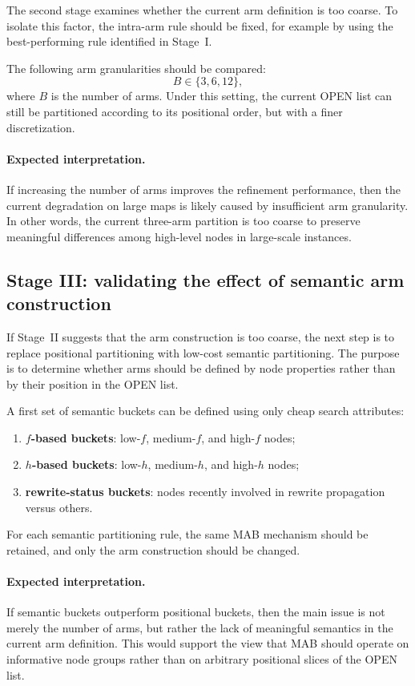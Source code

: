 \documentclass[lettersize,journal]{IEEEtran}
\begin{document}
The second stage examines whether the current arm definition is too coarse. To isolate this factor, the intra-arm rule should be fixed, for example by using the best-performing rule identified in Stage~I.

The following arm granularities should be compared:
\[
B \in \{3, 6, 12\},
\]
where $B$ is the number of arms. Under this setting, the current OPEN list can still be partitioned according to its positional order, but with a finer discretization.

\paragraph{Expected interpretation.}
If increasing the number of arms improves the refinement performance, then the current degradation on large maps is likely caused by insufficient arm granularity. In other words, the current three-arm partition is too coarse to preserve meaningful differences among high-level nodes in large-scale instances.

\subsection{Stage III: validating the effect of semantic arm construction}
\label{subsec:stage3_semantic_arms}

If Stage~II suggests that the arm construction is too coarse, the next step is to replace positional partitioning with low-cost semantic partitioning. The purpose is to determine whether arms should be defined by node properties rather than by their position in the OPEN list.

A first set of semantic buckets can be defined using only cheap search attributes:
\begin{enumerate}[(1)]
    \item \textbf{$f$-based buckets}: low-$f$, medium-$f$, and high-$f$ nodes;
    \item \textbf{$h$-based buckets}: low-$h$, medium-$h$, and high-$h$ nodes;
    \item \textbf{rewrite-status buckets}: nodes recently involved in rewrite propagation versus others.
\end{enumerate}

For each semantic partitioning rule, the same MAB mechanism should be retained, and only the arm construction should be changed.

\paragraph{Expected interpretation.}
If semantic buckets outperform positional buckets, then the main issue is not merely the number of arms, but rather the lack of meaningful semantics in the current arm definition. This would support the view that MAB should operate on informative node groups rather than on arbitrary positional slices of the OPEN list.
\end{document}
